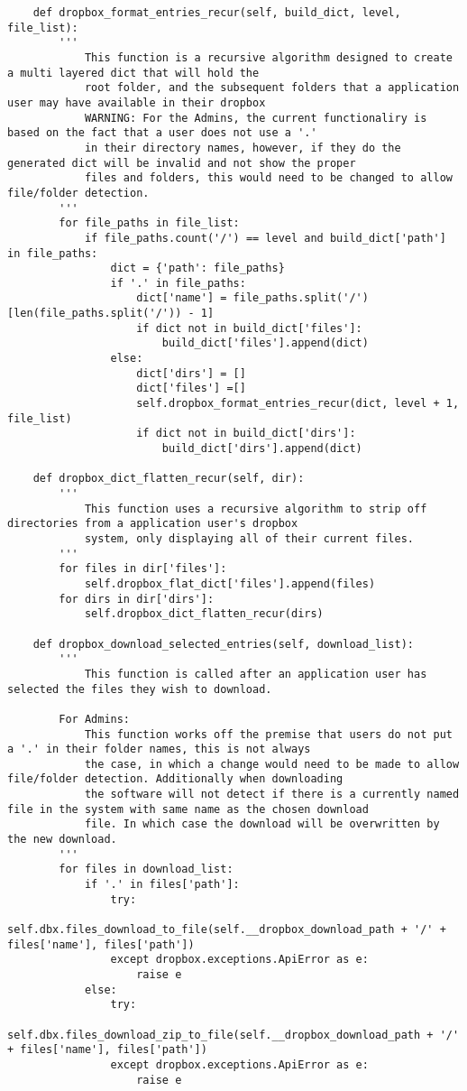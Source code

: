 \documentclass{article}
\begin{document}
\begin{verbatim}
    def dropbox_format_entries_recur(self, build_dict, level, file_list):
        '''
            This function is a recursive algorithm designed to create a multi layered dict that will hold the 
            root folder, and the subsequent folders that a application user may have available in their dropbox
            WARNING: For the Admins, the current functionaliry is based on the fact that a user does not use a '.' 
            in their directory names, however, if they do the generated dict will be invalid and not show the proper 
            files and folders, this would need to be changed to allow file/folder detection.
        '''
        for file_paths in file_list:
            if file_paths.count('/') == level and build_dict['path'] in file_paths:
                dict = {'path': file_paths}
                if '.' in file_paths:
                    dict['name'] = file_paths.split('/')[len(file_paths.split('/')) - 1]
                    if dict not in build_dict['files']:
                        build_dict['files'].append(dict)
                else:
                    dict['dirs'] = []
                    dict['files'] =[]
                    self.dropbox_format_entries_recur(dict, level + 1, file_list)
                    if dict not in build_dict['dirs']:
                        build_dict['dirs'].append(dict)         

    def dropbox_dict_flatten_recur(self, dir):
        '''
            This function uses a recursive algorithm to strip off directories from a application user's dropbox
            system, only displaying all of their current files. 
        '''
        for files in dir['files']:
            self.dropbox_flat_dict['files'].append(files)
        for dirs in dir['dirs']:
            self.dropbox_dict_flatten_recur(dirs)

    def dropbox_download_selected_entries(self, download_list):
        '''
            This function is called after an application user has selected the files they wish to download.
        
        For Admins:
            This function works off the premise that users do not put a '.' in their folder names, this is not always 
            the case, in which a change would need to be made to allow file/folder detection. Additionally when downloading
            the software will not detect if there is a currently named file in the system with same name as the chosen download 
            file. In which case the download will be overwritten by the new download. 
        '''
        for files in download_list:
            if '.' in files['path']:
                try: 
                    self.dbx.files_download_to_file(self.__dropbox_download_path + '/' + files['name'], files['path'])
                except dropbox.exceptions.ApiError as e:
                    raise e
            else:
                try: 
                    self.dbx.files_download_zip_to_file(self.__dropbox_download_path + '/' + files['name'], files['path'])
                except dropbox.exceptions.ApiError as e:
                    raise e
\end{verbatim}
\end{document}
